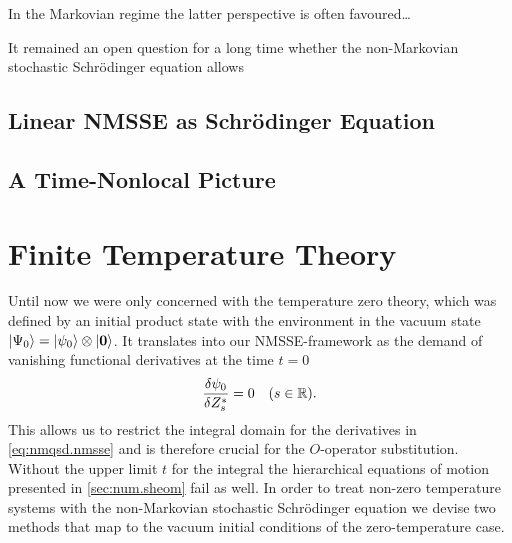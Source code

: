In the Markovian regime the latter perspective is often favoured\dots

It remained an open question for a long time whether the non-Markovian stochastic Schrödinger equation allows

\subsection{Linear NMSSE as Schrödinger Equation}
\label{sub:nmqsd.interpretation.unitary_view}

\subsection{A Time-Nonlocal Picture}
\label{sub:nmqsd.interpretation.time_osci}


\section{Finite Temperature Theory}
\label{sec:nmqsd.temperature}
%

Until now we were only concerned with the temperature zero theory, which was defined by an initial product state with the environment in the vacuum state $| \Psi_0 \rangle = | \psi_0 \rangle \otimes | \boldsymbol{0} \rangle$.
It translates into our NMSSE-framework as the demand of vanishing functional derivatives at the time $t = 0$
\begin{equation*}
  \frac{\delta \psi_0}{\delta {Z}^*_s} = 0 \quad (s \in \mathbb{R}).
\end{equation*}
This allows us to restrict the integral domain for the derivatives in \autoref{eq:nmqsd.nmsse} and is therefore crucial for the $O$-operator substitution.
Without the upper limit $t$ for the integral the hierarchical equations of motion presented in \autoref{sec:num.sheom} fail as well.
In order to treat non-zero temperature systems with the non-Markovian stochastic Schrödinger equation we devise two methods that map to the vacuum initial conditions of the zero-temperature case.

